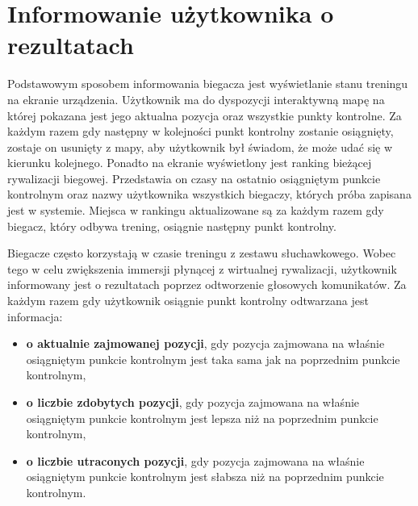 \section{Informowanie użytkownika o rezultatach}\label{chap:zasada-tts}
Podstawowym sposobem informowania biegacza jest wyświetlanie stanu treningu na ekranie urządzenia. Użytkownik ma do dyspozycji interaktywną mapę na której pokazana jest jego aktualna pozycja oraz wszystkie punkty kontrolne. Za każdym razem gdy następny w kolejności punkt kontrolny zostanie osiągnięty, zostaje on usunięty z mapy, aby użytkownik był świadom, że może udać się w kierunku kolejnego. Ponadto na ekranie wyświetlony jest ranking bieżącej rywalizacji biegowej. Przedstawia on czasy na ostatnio osiągniętym punkcie kontrolnym oraz nazwy użytkownika wszystkich biegaczy, których próba zapisana jest w systemie. Miejsca w rankingu aktualizowane są za każdym razem gdy biegacz, który odbywa trening, osiągnie następny punkt kontrolny.

Biegacze często korzystają w czasie treningu z zestawu słuchawkowego. Wobec tego w celu zwiększenia immersji płynącej z wirtualnej rywalizacji, użytkownik informowany jest o rezultatach poprzez odtworzenie głosowych komunikatów. Za każdym razem gdy użytkownik osiągnie punkt kontrolny odtwarzana jest informacja:
\begin{itemize}
\item{\textbf{o aktualnie zajmowanej pozycji}, gdy pozycja zajmowana na właśnie osiągniętym punkcie kontrolnym jest taka sama jak na poprzednim punkcie kontrolnym},
\item{\textbf{o liczbie zdobytych pozycji}, gdy pozycja zajmowana na właśnie osiągniętym punkcie kontrolnym jest lepsza niż na poprzednim punkcie kontrolnym},
\item{\textbf{o liczbie utraconych pozycji}, gdy pozycja zajmowana na właśnie osiągniętym punkcie kontrolnym jest słabsza niż na poprzednim punkcie kontrolnym}.
\end{itemize}